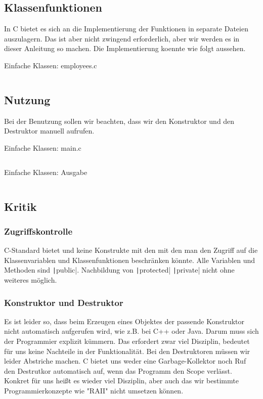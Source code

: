 \subsection{Klassenfunktionen}
In C bietet es sich an die Implementierung der Funktionen in separate Dateien auszulagern.
Das ist aber nicht zwingend erforderlich, aber wir werden es in dieser Anleitung so machen.
Die Implementierung koennte wie folgt aussehen.

\begin{code}
	\caption{Einfache Klassen: employees.c}
	\inputminted{C}{code/employees_plain/employee.c}
\end{code}


\subsection{Nutzung}
Bei der Benutzung sollen wir beachten, dass wir den Konstruktor und den Destruktor manuell aufrufen. 
\begin{code}
	\caption{Einfache Klassen: main.c}
	\inputminted{C}{code/employees_plain/main.c}
\end{code}

\begin{code}
	\caption{Einfache Klassen: Ausgabe}
	\inputminted[bgcolor=white]{text}{code/employees_plain/output.txt}
\end{code}

\subsection{Kritik}
\subsubsection{Zugriffskontrolle}
C-Standard bietet und keine Konstrukte mit den mit den man den Zugriff auf die Klassenvariablen und Klassenfunktionen beschränken könnte. Alle Variablen und Methoden sind \texttt|public|. Nachbildung von \texttt|protected| \texttt|private| nicht ohne weiteres möglich.
\subsubsection{Konstruktor und Destruktor}
Es ist leider so, dass beim Erzeugen eines Objektes der passende Konstruktor nicht automatisch aufgerufen wird, wie z.B. bei C++ oder Java.
Darum muss sich der Programmier explizit kümmern.
Das erfordert zwar viel Disziplin, bedeutet für uns keine Nachteile in der Funktionalität.
Bei den Destruktoren müssen wir leider Abstriche machen.
C bietet uns weder eine Garbage-Kollektor noch Ruf den Destrutkor automatisch auf, wenn das Programm den Scope verlässt.
Konkret für uns heißt es wieder viel Disziplin, aber auch das wir bestimmte Programmierkonzepte wie "RAII" nicht umsetzen können.


